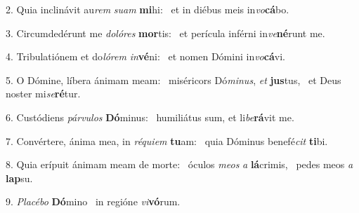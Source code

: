 2. Quia inclinávit au\textit{rem} \textit{su}\textit{am} \textbf{mi}hi: \ast\  et in diébus meis in\textit{vo}\textbf{cá}bo.\

3. Circumdedérunt me \textit{do}\textit{ló}\textit{res} \textbf{mor}tis: \ast\  et perícula inférni in\textit{ve}\textbf{né}runt me.\

4. Tribulatiónem et do\textit{ló}\textit{rem} \textit{in}\textbf{vé}ni: \ast\  et nomen Dómini in\textit{vo}\textbf{cá}vi.\

5. O Dómine, líbera ánimam meam: \dag\  miséricors Dó\textit{mi}\textit{nus}, \textit{et} \textbf{jus}tus, \ast\  et Deus noster mi\textit{se}\textbf{ré}tur.\

6. Custódiens \textit{pár}\textit{vu}\textit{los} \textbf{Dó}minus: \ast\  humiliátus sum, et li\textit{be}\textbf{rá}vit me.\

7. Convértere, ánima mea, in \textit{ré}\textit{qui}\textit{em} \textbf{tu}am: \ast\  quia Dóminus benefé\textit{cit} \textbf{ti}bi.\

8. Quia erípuit ánimam meam de morte: \dag\  óculos \textit{me}\textit{os} \textit{a} \textbf{lá}crimis, \ast\  pedes meos \textit{a} \textbf{lap}su.\

9. \textit{Pla}\textit{cé}\textit{bo} \textbf{Dó}mino \ast\  in regióne \textit{vi}\textbf{vó}rum.\

